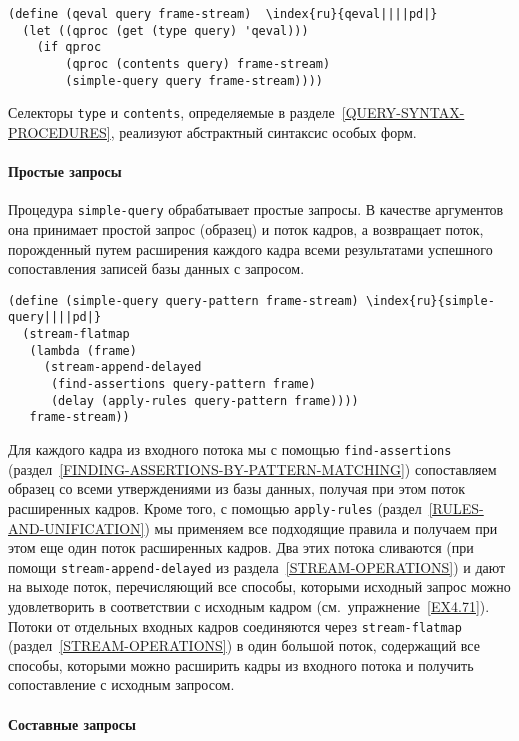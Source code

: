 \begin{Verbatim}[fontsize=\small]
(define (qeval query frame-stream)  \index{ru}{qeval||||pd|}
  (let ((qproc (get (type query) 'qeval)))
    (if qproc
        (qproc (contents query) frame-stream)
        (simple-query query frame-stream))))
\end{Verbatim}
Селекторы {\tt type} и {\tt contents}, определяемые в
разделе~\ref{QUERY-SYNTAX-PROCEDURES}, реализуют
абстрактный синтаксис особых форм.

\paragraph{Простые запросы}

Процедура {\tt simple-query} 
обрабатывает простые запросы.  В качестве аргументов она принимает простой 
запрос (образец) и поток кадров, а возвращает поток, порожденный путем
расширения каждого кадра всеми результатами успешного сопоставления
записей базы данных с запросом.

\begin{Verbatim}[fontsize=\small]
(define (simple-query query-pattern frame-stream) \index{ru}{simple-query||||pd|}
  (stream-flatmap
   (lambda (frame)
     (stream-append-delayed
      (find-assertions query-pattern frame)
      (delay (apply-rules query-pattern frame))))
   frame-stream))
\end{Verbatim}

Для каждого кадра из входного потока мы с помощью
{\tt find-assertions} 
(раздел~\ref{FINDING-ASSERTIONS-BY-PATTERN-MATCHING}) сопоставляем
образец со всеми утверждениями из базы данных, получая при этом поток
расширенных кадров.  Кроме того, с помощью {\tt apply-rules}
(раздел~\ref{RULES-AND-UNIFICATION}) мы применяем все
подходящие правила и получаем при этом еще один поток расширенных
кадров.  Два этих потока сливаются (при помощи
{\tt stream-append-delayed} из 
раздела~\ref{STREAM-OPERATIONS})
и дают на выходе поток, перечисляющий все способы, которыми исходный запрос
можно удовлетворить в соответствии с исходным кадром 
(см.~упражнение~\ref{EX4.71}).  Потоки от отдельных входных кадров
соединяются через {\tt stream-flatmap} 
(раздел~\ref{STREAM-OPERATIONS}) в один большой поток, содержащий
все способы, которыми можно расширить кадры из входного потока и
получить сопоставление с исходным запросом.

\paragraph{Составные запросы}

